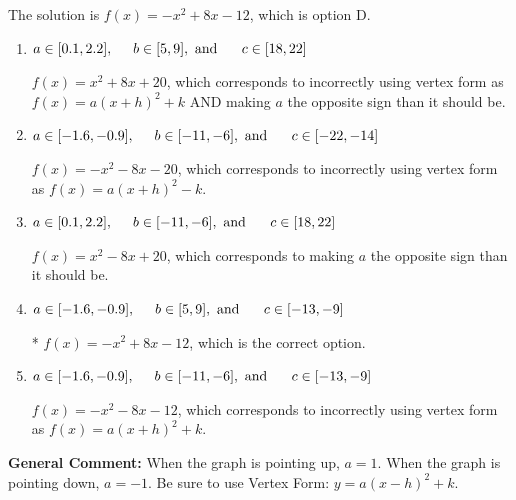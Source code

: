 \documentclass{extbook}[14pt]
\begin{document}
\begin{enumerate}
{The solution is \( f(x) = -x^{2} +8 x -12 \), which is option D.\begin{enumerate}[label=\Alph*.]
\item \( a \in [0.1, 2.2], \hspace*{5mm} b \in [5, 9], \text{ and } \hspace*{5mm} c \in [18, 22] \)

$f(x)=x^{2} +8 x + 20$, which corresponds to incorrectly using vertex form as $f(x) = a(x+h)^2+k$ AND making $a$ the opposite sign than it should be.
\item \( a \in [-1.6, -0.9], \hspace*{5mm} b \in [-11, -6], \text{ and } \hspace*{5mm} c \in [-22, -14] \)

$f(x)=-x^{2} -8 x -20$, which corresponds to incorrectly using vertex form as $f(x) = a(x+h)^2 - k$.
\item \( a \in [0.1, 2.2], \hspace*{5mm} b \in [-11, -6], \text{ and } \hspace*{5mm} c \in [18, 22] \)

$f(x)=x^{2} -8 x + 20$, which corresponds to making $a$ the opposite sign than it should be.
\item \( a \in [-1.6, -0.9], \hspace*{5mm} b \in [5, 9], \text{ and } \hspace*{5mm} c \in [-13, -9] \)

* $f(x)=-x^{2} +8 x -12$, which is the correct option.
\item \( a \in [-1.6, -0.9], \hspace*{5mm} b \in [-11, -6], \text{ and } \hspace*{5mm} c \in [-13, -9] \)

$f(x)=-x^{2} -8 x -12$, which corresponds to incorrectly using vertex form as $f(x) = a(x+h)^2+k$.
\end{enumerate}

\textbf{General Comment:} When the graph is pointing up, $a=1$. When the graph is pointing down, $a=-1$. Be sure to use Vertex Form: $y = a(x-h)^2+k$.
}
\end{enumerate}
\end{document}
